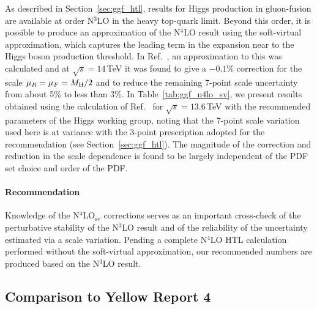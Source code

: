 As described in Section~\ref{sec:ggf_htl}, results for Higgs production in gluon-fusion are available at order N$^3$LO in the heavy top-quark limit.
Beyond this order, it is possible to produce an approximation of the N$^4$LO result using the soft-virtual approximation, which captures the leading term in the expansion near to the Higgs boson production threshold.
In Ref.~\cite{Das:2020adl}, an approximation to this was calculated and at $\sqrt{s}=14$\,TeV it was found to give a $-0.1\%$ correction for the scale $\mu_R=\mu_F=M_\mathrm{H}/2$ and to reduce the remaining 7-point scale uncertainty from about 5\% to less than 3\%.
In Table~\ref{tab:ggf_n4lo_sv}, we present results obtained using the calculation of Ref.~\cite{Das:2020adl} for $\sqrt{s}=13.6$\,TeV with the recommended parameters of the Higgs working group, noting that the 7-point scale variation used here is at variance with the 3-point prescription adopted for the recommendation (see Section~\ref{sec:ggf_htl}).
The magnitude of the correction and reduction in the scale dependence is found to be largely independent of the PDF set choice and order of the PDF.

\paragraph{Recommendation}
Knowledge of the N$^4$LO$_\mathrm{sv}$ corrections serves as an important cross-check of the perturbative stability of the N$^3$LO result and of the reliability of the uncertainty estimated via a scale variation.
Pending a complete N$^4$LO HTL calculation performed without the soft-virtual approximation, our recommended numbers are produced based on the N$^3$LO result.


\subsection{Comparison to Yellow Report 4}
\label{sec:ggf_yr4}

